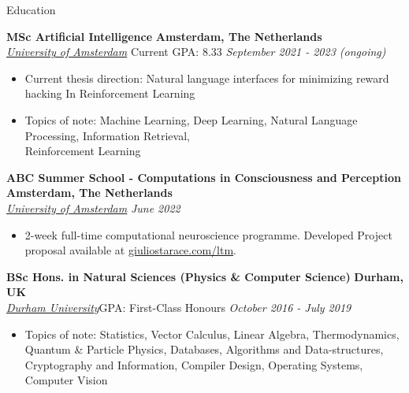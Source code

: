 \documentclass{resume} %
\begin{document}
\begin{rSection}{Education}

	{\bf MSc Artificial Intelligence} \hfill \textbf{Amsterdam, The Netherlands}
	\\\href{https://www.dur.ac.uk/}{\textit{University of Amsterdam}} \hfill Current GPA: 8.33 \hfill {\em September 2021
		- 2023 (ongoing)}
	\begin{itemize}
		\item Current thesis direction: Natural language interfaces for minimizing reward hacking In
		      Reinforcement Learning
		\item Topics of note: Machine Learning, Deep Learning, Natural Language Processing, Information
		      Retrieval,\\ Reinforcement Learning
	\end{itemize}

	{\bf ABC Summer School - Computations in Consciousness and Perception} \hfill \textbf{Amsterdam, The Netherlands}
	\\\href{https://www.dur.ac.uk/}{\textit{University of Amsterdam}} \hfill {\em June 2022}
	\begin{itemize}
		\item 2-week full-time computational neuroscience programme. Developed Project proposal
		      available at \href{https://www.giuliostarace.com/ltm/}{giuliostarace.com/ltm}.
	\end{itemize}

	{\bf BSc Hons. in Natural Sciences (Physics \& Computer Science)} \hfill \textbf{Durham, UK}
	\\\href{https://www.dur.ac.uk/}{\textit{Durham University}}\hfill GPA: First-Class Honours \hfill {\em October 2016 - July 2019}
	\begin{itemize}\vspace{-0.5em}
		\item Topics of note: Statistics, Vector Calculus, Linear Algebra, Thermodynamics, Quantum \&
		      Particle Physics, Databases, Algorithms and Data-structures, Cryptography and Information,
		      Compiler Design, Operating Systems, Computer Vision
	\end{itemize}
\end{rSection}
\end{document}
